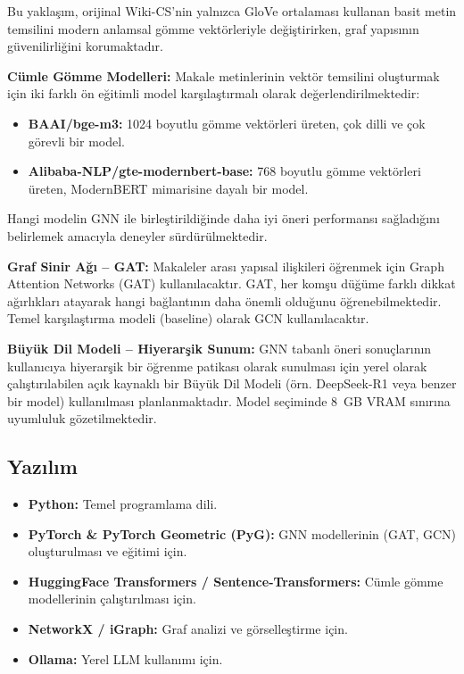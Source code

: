 \documentclass[12pt, a4paper]{article}
\begin{document}
Bu yaklaşım, orijinal Wiki-CS'nin yalnızca GloVe ortalaması kullanan basit metin temsilini modern anlamsal gömme vektörleriyle değiştirirken, graf yapısının güvenilirliğini korumaktadır.

\textbf{Cümle Gömme Modelleri:}
Makale metinlerinin vektör temsilini oluşturmak için iki farklı ön eğitimli model karşılaştırmalı olarak değerlendirilmektedir:
\begin{itemize}
    \item \textbf{BAAI/bge-m3:} 1024 boyutlu gömme vektörleri üreten, çok dilli ve çok görevli bir model.
    \item \textbf{Alibaba-NLP/gte-modernbert-base:} 768 boyutlu gömme vektörleri üreten, ModernBERT mimarisine dayalı bir model.
\end{itemize}
Hangi modelin GNN ile birleştirildiğinde daha iyi öneri performansı sağladığını belirlemek amacıyla deneyler sürdürülmektedir.

\textbf{Graf Sinir Ağı -- GAT:}
Makaleler arası yapısal ilişkileri öğrenmek için Graph Attention Networks (GAT) \cite{velickovic2018graph} kullanılacaktır. GAT, her komşu düğüme farklı dikkat ağırlıkları atayarak hangi bağlantının daha önemli olduğunu öğrenebilmektedir. Temel karşılaştırma modeli (baseline) olarak GCN \cite{kipf2017semi} kullanılacaktır.

\textbf{Büyük Dil Modeli -- Hiyerarşik Sunum:}
GNN tabanlı öneri sonuçlarının kullanıcıya hiyerarşik bir öğrenme patikası olarak sunulması için yerel olarak çalıştırılabilen açık kaynaklı bir Büyük Dil Modeli (örn. DeepSeek-R1 veya benzer bir model) kullanılması planlanmaktadır. Model seçiminde 8~GB VRAM sınırına uyumluluk gözetilmektedir.

\subsection{Yazılım}

\begin{itemize}
    \item \textbf{Python:} Temel programlama dili.
    \item \textbf{PyTorch \& PyTorch Geometric (PyG):} GNN modellerinin (GAT, GCN) oluşturulması ve eğitimi için.
    \item \textbf{HuggingFace Transformers / Sentence-Transformers:} Cümle gömme modellerinin çalıştırılması için.
    \item \textbf{NetworkX / iGraph:} Graf analizi ve görselleştirme için.
    \item \textbf{Ollama:} Yerel LLM kullanımı için.
\end{itemize}
\end{document}
